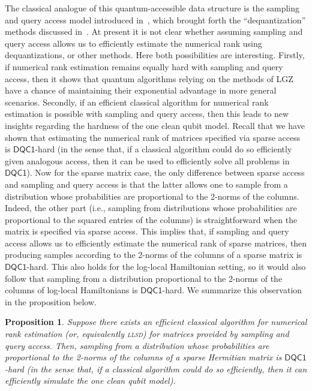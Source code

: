 \documentclass[a4paper, onecolumn, accepted=2022-08-28]{quantumarticle}
\newtheorem{proposition}[theorem]{Proposition}
\begin{document}
The classical analogue of this quantum-accessible data structure is the sampling and query access model introduced in~\cite{tang:dequantization}, which brought forth the ``dequantization'' methods discussed in~\cite{chia:dequantizations}.
At present it is not clear whether assuming sampling and query access allows us to efficiently estimate the numerical rank using dequantizations, or other methods.
Here both possibilities are interesting.
Firstly, if numerical rank estimation remains equally hard with sampling and query access, then it shows that quantum algorithms relying on the methods of LGZ have a chance of maintaining their exponential advantage in more general scenarios.
Secondly, if an efficient classical algorithm for numerical rank estimation is possible with sampling and query access, then this leads to new insights regarding the hardness of the one clean qubit model.
Recall that we have shown that estimating the numerical rank of matrices specified via sparse access is $\mathsf{DQC1}$-hard (in the sense that, if a classical algorithm could do so efficiently given analogous access, then it can be used to efficiently solve all problems in $\mathsf{DQC1}$).
Now for the sparse matrix case, the only difference between sparse access and sampling and query access is that the latter allows one to sample from a distribution whose probabilities are proportional to the 2-norms of the columns.
Indeed, the other part (i.e., sampling from distributions whose probabilities are proportional to the squared entries of the columns) is straightforward when the matrix is specified via sparse access.
This implies that, if sampling and query access allows us to efficiently estimate the numerical rank of sparse matrices, then producing samples according to the 2-norms of the columns of a sparse matrix is $\mathsf{DQC1}$-hard. 
This also holds for the log-local Hamiltonian setting, so it would also follow that sampling from a distribution proportional to the 2-norms of the columns of log-local Hamiltonians is $\mathsf{DQC1}$-hard.
We summarize this observation in the proposition below.

\begin{proposition}
Suppose there exists an efficient classical algorithm for numerical rank estimation (or, equivalently \textsc{llsd}) for matrices provided by sampling and query access.
Then, sampling from a distribution whose probabilities are proportional to the 2-norms of the columns of a sparse Hermitian matrix is $\mathsf{DQC1}$-hard (in the sense that, if a classical algorithm could do so efficiently, then it can efficiently simulate the one clean qubit model).
\end{proposition}
\end{document}
